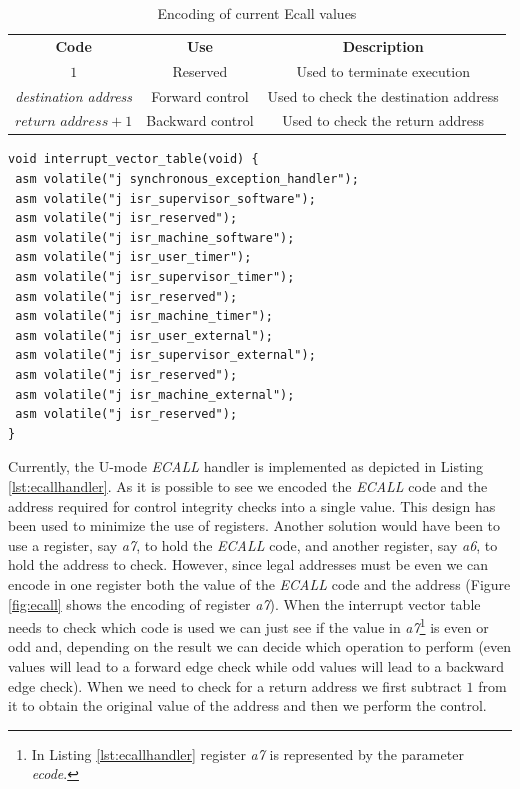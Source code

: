 \begin{table}
  \centering
  \begin{tabular}{|c|c|c|}
    \hline
    \textbf{Code}                & \textbf{Use}     & \textbf{Description}                  \\
    \hhline{===} $1$             & Reserved         & Used to terminate execution           \\
    \hline
    \textit{destination address} & Forward control  & Used to check the destination address \\
    \hline
    $\textit{return address}+ 1$ & Backward control & Used to check the return address      \\
    \hline
  \end{tabular}
  \caption{Encoding of current Ecall values}
  \label{tab:ecalls}
\end{table}

\begin{lstlisting}[style=CStyle, caption = Interrput Vector Table, label={lst:intrtable}]
void interrupt_vector_table(void) {
 asm volatile("j synchronous_exception_handler");
 asm volatile("j isr_supervisor_software");
 asm volatile("j isr_reserved");
 asm volatile("j isr_machine_software");
 asm volatile("j isr_user_timer");
 asm volatile("j isr_supervisor_timer");
 asm volatile("j isr_reserved");
 asm volatile("j isr_machine_timer");
 asm volatile("j isr_user_external");
 asm volatile("j isr_supervisor_external");
 asm volatile("j isr_reserved");
 asm volatile("j isr_machine_external");
 asm volatile("j isr_reserved");
}
\end{lstlisting}

Currently, the U-mode \textit{ECALL} handler is implemented as depicted in
Listing \ref{lst:ecallhandler}. As it is possible to see we encoded the \textit{ECALL}
code and the address required for control integrity checks into a single value. This
design has been used to minimize the use of registers. Another solution would
have been to use a register, say \textit{a7}, to hold the \textit{ECALL} code, and
another register, say \textit{a6}, to hold the address to check. However, since
legal addresses must be even we can encode in one register both the value of the
\textit{ECALL} code and the address (Figure \ref{fig:ecall} shows the encoding
of register \textit{a7}). When the interrupt vector table needs to check which code
is used we can just see if the value in \textit{a7}\footnote{In Listing
\ref{lst:ecallhandler} register \textit{a7} is represented by the parameter \textit{ecode}.}
is even or odd and, depending on the result we can decide which operation to
perform (even values will lead to a forward edge check while odd values will lead
to a backward edge check). When we need to check for a return address we first subtract
$1$ from it to obtain the original value of the address and then we perform the control.

